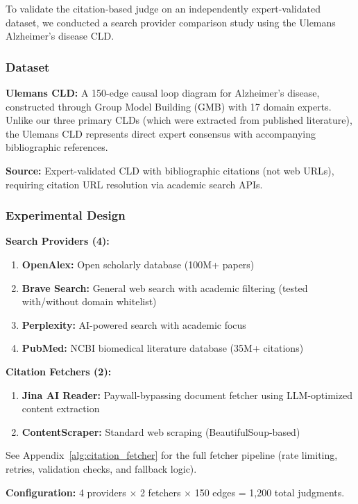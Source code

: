 To validate the citation-based judge on an independently expert-validated dataset, we conducted a search provider comparison study using the Ulemans Alzheimer's disease CLD.

\subsubsection{Dataset}

\textbf{Ulemans CLD:} A 150-edge causal loop diagram for Alzheimer's disease, constructed through Group Model Building (GMB) with 17 domain experts. Unlike our three primary CLDs (which were extracted from published literature), the Ulemans CLD represents direct expert consensus with accompanying bibliographic references.

\textbf{Source:} Expert-validated CLD with bibliographic citations (not web URLs), requiring citation URL resolution via academic search APIs.

\subsubsection{Experimental Design}

\textbf{Search Providers (4):}
\begin{enumerate}[noitemsep]
    \item \textbf{OpenAlex:} Open scholarly database (100M+ papers)
    \item \textbf{Brave Search:} General web search with academic filtering (tested with/without domain whitelist)
    \item \textbf{Perplexity:} AI-powered search with academic focus
    \item \textbf{PubMed:} NCBI biomedical literature database (35M+ citations)
\end{enumerate}

\textbf{Citation Fetchers (2):}
\begin{enumerate}[noitemsep]
    \item \textbf{Jina AI Reader:} Paywall-bypassing document fetcher using LLM-optimized content extraction
    \item \textbf{ContentScraper:} Standard web scraping (BeautifulSoup-based)
\end{enumerate}
See Appendix~\ref{alg:citation_fetcher} for the full fetcher pipeline (rate limiting, retries, validation checks, and fallback logic).

\textbf{Configuration:} 4 providers $\times$ 2 fetchers $\times$ 150 edges = 1,200 total judgments.

